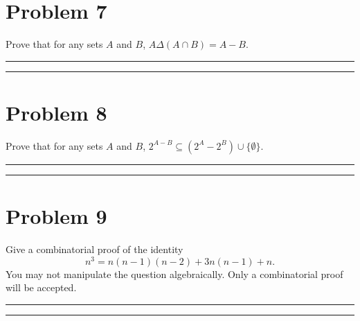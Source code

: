 \documentclass{article}
\theoremstyle{definition}
\newenvironment{solution}{\bigskip\hrule{\hfill}}{\bigskip\hrule{\hfill}} %
\begin{document}

\newpage


\section*{Problem 7}
Prove that for any sets $A$ and $B$, $A\Delta\left(A\cap B\right)=A-B$.
\begin{solution}


\end{solution}


\newpage


\section*{Problem 8}
Prove that for any sets $A$ and $B$, $2^{A-B}\subseteq\left(2^A-2^B\right)\cup\{\emptyset\}$.
\begin{solution}


\end{solution}


\newpage


\section*{Problem 9}
Give a combinatorial proof of the identity $$n^3=n\left(n-1\right)\left(n-2\right)+3n\left(n-1\right)+n.$$ You may not manipulate the question algebraically. Only a combinatorial proof will be accepted.
\begin{solution}


\end{solution}
\end{document}
